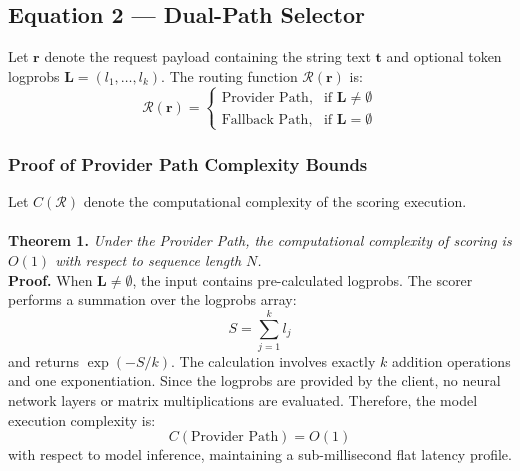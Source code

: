 \documentclass[10pt]{article}
\begin{document}
\subsection{Equation 2 --- Dual-Path Selector}
Let $\mathbf{r}$ denote the request payload containing the string text $\mathbf{t}$ and optional token logprobs $\mathbf{L} = (l_1, \dots, l_k)$. The routing function $\mathcal{R}(\mathbf{r})$ is:
\begin{equation}
\mathcal{R}(\mathbf{r}) = \begin{cases} \text{Provider Path}, & \text{if } \mathbf{L} \ne \emptyset \\ \text{Fallback Path}, & \text{if } \mathbf{L} = \emptyset \end{cases}
\end{equation}

\subsubsection{Proof of Provider Path Complexity Bounds}
Let $C(\mathcal{R})$ denote the computational complexity of the scoring execution.
\\
\\
\textbf{Theorem 1.} \textit{Under the Provider Path, the computational complexity of scoring is $O(1)$ with respect to sequence length $N$.}
\\
\textbf{Proof.}
When $\mathbf{L} \ne \emptyset$, the input contains pre-calculated logprobs. The scorer performs a summation over the logprobs array:
\begin{equation}
S = \sum_{j=1}^k l_j
\end{equation}
and returns $\exp(-S/k)$. The calculation involves exactly $k$ addition operations and one exponentiation. Since the logprobs are provided by the client, no neural network layers or matrix multiplications are evaluated.
Therefore, the model execution complexity is:
\begin{equation}
C(\text{Provider Path}) = O(1)
\end{equation}
with respect to model inference, maintaining a sub-millisecond flat latency profile.
\end{document}

